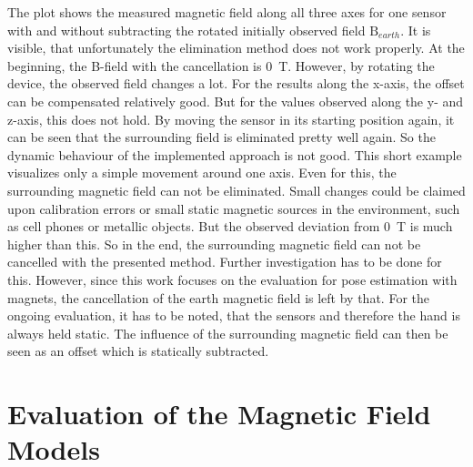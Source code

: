 The plot shows the measured magnetic field along all three axes for one sensor with and without subtracting the rotated initially observed field $ \mathrm{B}_{earth} $. It is visible, that unfortunately the elimination method does not work properly. At the beginning, the B-field with the cancellation is \SI{0}{\tesla}. However, by rotating the device, the observed field changes a lot. For the results along the x-axis, the offset can be compensated relatively good. But for the values observed along the y- and z-axis, this does not hold. By moving the sensor in its starting position again, it can be seen that the surrounding field is eliminated pretty well again. So the dynamic behaviour of the implemented approach is not good. This short example visualizes only a simple movement around one axis. Even for this, the surrounding magnetic field can not be eliminated. Small changes could be claimed upon calibration errors or small static magnetic sources in the environment, such as cell phones or metallic objects. But the observed deviation from \SI{0}{\tesla} is much higher than this. So in the end, the surrounding magnetic field can not be cancelled with the presented method. Further investigation has to be done for this. However, since this work focuses on the evaluation for pose estimation with magnets, the cancellation of the earth magnetic field is left by that. For the ongoing evaluation, it has to be noted, that the sensors and therefore the hand is always held static. The influence of the surrounding magnetic field can then be seen as an offset which is statically subtracted.

\FloatBarrier
\section{Evaluation of the Magnetic Field Models} \label{sec:modelDif}


